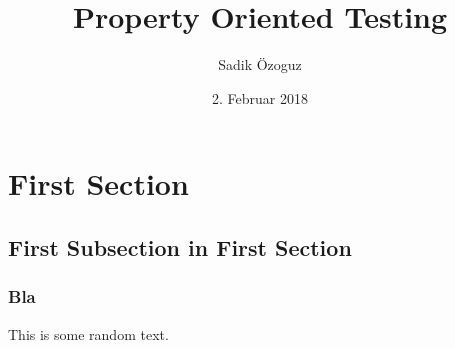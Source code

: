 \documentclass[10pt]{beamer}
\title{Property Oriented Testing}
\author{Sadik Özoguz}
\institute{Universit{\"a}t Bremen}
\date[02.02.2018]{2. Februar 2018}
\begin{document}
\begin{frame}
  \titlepage
\end{frame}

\section{First Section}

\subsection[Subsection 1]{First Subsection in First Section}

\begin{frame}
  \frametitle{Bla}
  This is some random text.
\end{frame}
\end{document}
